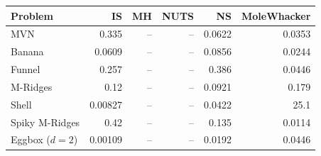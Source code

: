 \begin{tabular}{lrrrrr}
\toprule
Problem & IS & MH & NUTS & NS & MoleWhacker \\
\midrule
MVN & 0.335 & -- & -- & 0.0622 & 0.0353 \\
Banana & 0.0609 & -- & -- & 0.0856 & 0.0244 \\
Funnel & 0.257 & -- & -- & 0.386 & 0.0446 \\
M-Ridges & 0.12 & -- & -- & 0.0921 & 0.179 \\
Shell & 0.00827 & -- & -- & 0.0422 & 25.1 \\
Spiky M-Ridges & 0.42 & -- & -- & 0.135 & 0.0114 \\
\midrule
Eggbox ($d=2$) & 0.00109 & -- & -- & 0.0192 & 0.0446 \\
\bottomrule
\end{tabular}
